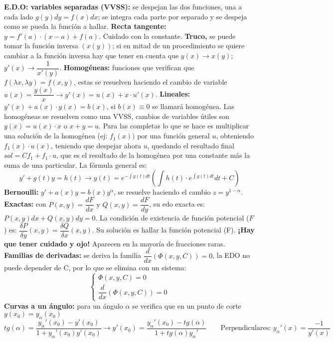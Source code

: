 \documentclass[a4paper, landscape, 12pt]{article}
\begin{document}
	
\textbf{E.D.O: variables separadas (VVSS):} se despejan las dos funciones, una 
a cada lado $g(y)dy = f(x)dx$; se integra cada parte por separado y se 
despeja como se pueda la función a hallar. \textbf{Recta tangente:} $y = f'(a)\cdot(x-a)+ f(a)$. Cuidado con la constante. \textbf{Truco,} se puede tomar la función inversa $(x(y))$; si en mitad de un procedimiento se quiere cambiar a la función inversa hay que tener en cuenta que $y(x) \rightarrow x(y)$; $y'(x) \rightarrow \dfrac{1}{x'(y)}$. \textbf{Homogéneas:} funciones que verifican que $f(\lambda x, \lambda y) = f(x,y)$, estas se resuelven haciendo el cambio de variable $u(x) = \dfrac{y(x)}{x} \rightarrow y'(x) = u(x) + x\cdot u'(x)$. \textbf{Lineales:} $y'(x) + a(x)\cdot y(x) = b(x)$, si $b(x) \equiv 0$ se llamará homogénea. Las homogéneas se resuelven como una VVSS, cambios de variables útiles son $y(x) = u(x) \cdot x$ o $x + y = u$. Para las completas lo que se hace es multiplicar una solución de la homogénea (ej: $f_1(x))$ por una función general $u$, obteniendo $f_1(x) \cdot u(x)$, teniendo que despejar ahora $u$, quedando el resultado final $sol = Cf_1 + f_1 \cdot u$, que es el resultado de la homogénea por una constante más la suma de una particular. La fórmula general es: $$y' +g(t)y = h(t) \rightarrow y(t) = e^{-\int g(t)dt} \left(\int h(t) \cdot e^{\int g(t)dt} dt + C \right)$$\textbf{Bernoulli:} $y' + a(x)y = b(x)y^\alpha$, se resuelve haciendo el cambio $z = y^{1 - \alpha}$. \textbf{Exactas:} con $P(x,y) = \dfrac{dF}{dx} \text{ y } Q(x,y) = \dfrac{dF}{dy}$, su edo exacta es: $P(x,y)dx + Q(x,y)dy = 0$. La condición de existencia de función potencial ($F$) es: $\dfrac{\delta P}{\delta y}(x,y) = \dfrac{\delta Q}{\delta x}(x,y)$. Su solución es hallar la función potencial (F). \textbf{¡Hay que tener cuidado y ojo!} Aparecen en la mayoría de fracciones raras. \textbf{Familias de derivadas:} se deriva la familia $\dfrac{d}{dx}(\Phi(x,y,C)) = 0$, la EDO no puede depender de C, por lo que se elimina con un sistema:
\begin{equation*}
	\left\{
	\begin{array}{l}
	\Phi(x,y,C) = 0 \\
	\dfrac{d}{dx}(\Phi(x,y,C)) = 0
	\end{array} 
	\right.
\end{equation*}
\textbf{Curvas a un ángulo:} para un ángulo $\alpha$ se verifica que en un 
punto de corte $y(x_0) = y_\alpha (x_0)$ $$tg(\alpha) = \frac{y_\alpha'(x_0) - 
y'(x_0)}{1 + y_\alpha' (x_0)y'(x_0)} \rightarrow y'(x_0) = \frac{y_\alpha'(x_0) 
- tg(\alpha)}{1 + tg(\alpha)y_\alpha'} \qquad \text{Perpendiculares: } y_\alpha'(x) = \frac{-1}{y'(x)}$$
\end{document}
